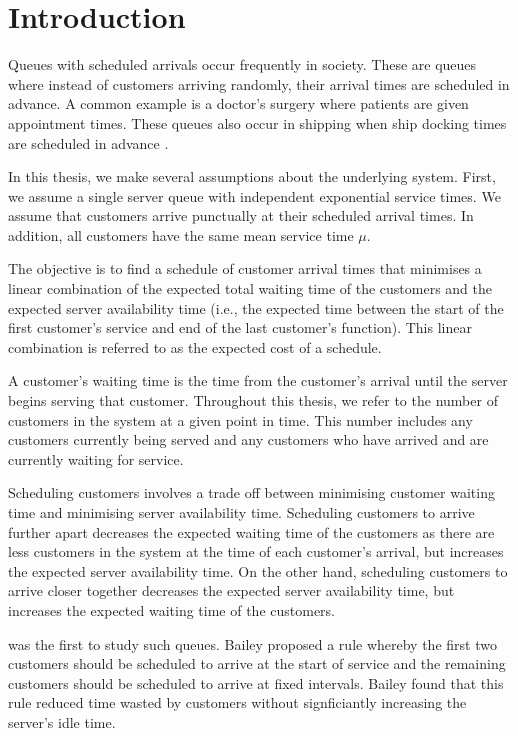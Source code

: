 \chapter{Introduction}
Queues with scheduled arrivals occur frequently in society. These are queues where instead of customers arriving randomly, their arrival times are scheduled in advance. A common example is a doctor's surgery where patients are given appointment times. These queues also occur in shipping when ship docking times are scheduled in advance \citep{Wang2}.

In this thesis, we make several assumptions about the underlying system. First, we assume a single server queue with independent exponential service times. We assume that customers arrive punctually at their scheduled arrival times. In addition, all customers have the same mean service time $\mu$.

The objective is to find a schedule of customer arrival times that minimises a linear combination of the expected total waiting time of the customers and the expected server availability time (i.e., the expected time between the start of the first customer's service and end of the last customer's function). This linear combination is referred to as the expected cost of a schedule.

A customer's waiting time is the time from the customer's arrival until the server begins serving that customer. Throughout this thesis, we refer to the number of customers in the system at a given point in time. This number includes any customers currently being served and any customers who have arrived and are currently waiting for service.

Scheduling customers involves a trade off between minimising customer waiting time and minimising server availability time. Scheduling customers to arrive further apart decreases the expected waiting time of the customers as there are less customers in the system at the time of each customer's arrival, but increases the expected server availability time. On the other hand, scheduling customers to arrive closer together decreases the expected server availability time, but increases the expected waiting time of the customers.

\citet{Bailey} was the first to study such queues. Bailey proposed a rule whereby the first two customers should be scheduled to arrive at the start of service and the remaining customers should be scheduled to arrive at fixed intervals. Bailey found that this rule reduced time wasted by customers without signficiantly increasing the server's idle time.

